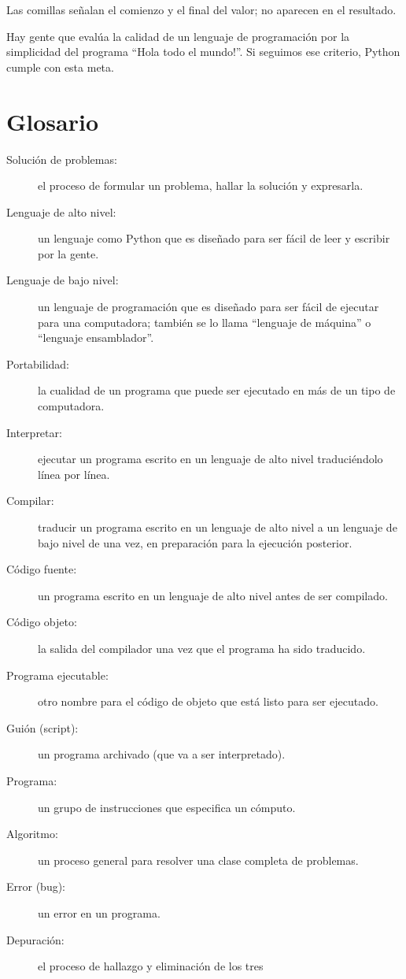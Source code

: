 Las comillas señalan el comienzo y el final del valor; no aparecen
en el resultado.

 

Hay gente que evalúa la calidad de un lenguaje de programación por
la simplicidad del programa ``Hola todo el mundo!''. Si seguimos
ese criterio, Python cumple con esta meta.

\section{Glosario}
\begin{description}
\item [{Solución de problemas:}] el proceso de formular un problema,
hallar la solución y expresarla.
\item [{Lenguaje de alto nivel:}] un lenguaje como Python que es diseñado
para ser fácil de leer y escribir por la gente.
\item [{Lenguaje de bajo nivel:}] un lenguaje de programación que es diseñado
para ser fácil de ejecutar para una computadora; también se lo llama
``lenguaje de máquina'' o ``lenguaje ensamblador''.
\item [{Portabilidad:}] la cualidad de un programa que puede ser ejecutado
en más de un tipo de computadora.
\item [{Interpretar:}] ejecutar un programa escrito en un lenguaje de alto
nivel traduciéndolo línea por línea.
\item [{Compilar:}] traducir un programa escrito en un lenguaje de alto
nivel a un lenguaje de bajo nivel de una vez, en preparación para
la ejecución posterior.
\item [{Código fuente:}] un programa escrito en un lenguaje de alto nivel
antes de ser compilado.
\item [{Código objeto:}] la salida del compilador una vez que el programa
ha sido traducido.
\item [{Programa ejecutable:}] otro nombre para el código de objeto que
está listo para ser ejecutado.
\item [{Guión (script):}] un programa archivado (que va a ser interpretado).
\item [{Programa:}] un grupo de instrucciones que especifica un cómputo.
\item [{Algoritmo:}] un proceso general para resolver una clase completa
de problemas.
\item [{Error (bug):}] un error en un programa.
\item [{Depuración:}] el proceso de hallazgo y eliminación de los tres

\end{description}
